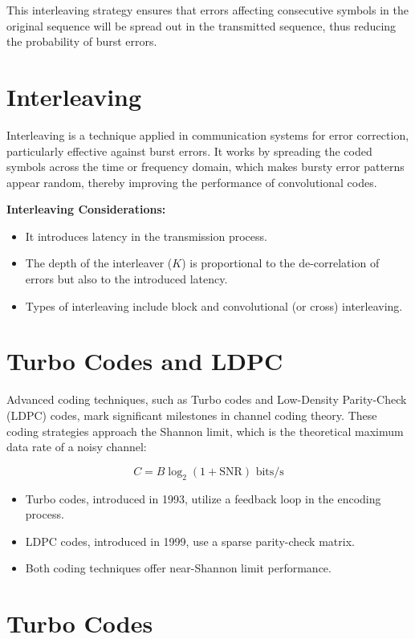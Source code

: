 This interleaving strategy ensures that errors affecting consecutive symbols in the original sequence will be spread out in the transmitted sequence, thus reducing the probability of burst errors.



\section*{Interleaving}
Interleaving is a technique applied in communication systems for error correction, particularly effective against burst errors. It works by spreading the coded symbols across the time or frequency domain, which makes bursty error patterns appear random, thereby improving the performance of convolutional codes.

\textbf{Interleaving Considerations:}
\begin{itemize}
    \item It introduces latency in the transmission process.
    \item The depth of the interleaver (\( K \)) is proportional to the de-correlation of errors but also to the introduced latency.
    \item Types of interleaving include block and convolutional (or cross) interleaving.
\end{itemize}

\section*{Turbo Codes and LDPC}
Advanced coding techniques, such as Turbo codes and Low-Density Parity-Check (LDPC) codes, mark significant milestones in channel coding theory. These coding strategies approach the Shannon limit, which is the theoretical maximum data rate of a noisy channel:

\[ C = B \log_2 (1 + \text{SNR}) \text{ bits/s} \]

\begin{itemize}
    \item Turbo codes, introduced in 1993, utilize a feedback loop in the encoding process.
    \item LDPC codes, introduced in 1999, use a sparse parity-check matrix.
    \item Both coding techniques offer near-Shannon limit performance.
\end{itemize}


\section*{Turbo Codes}


